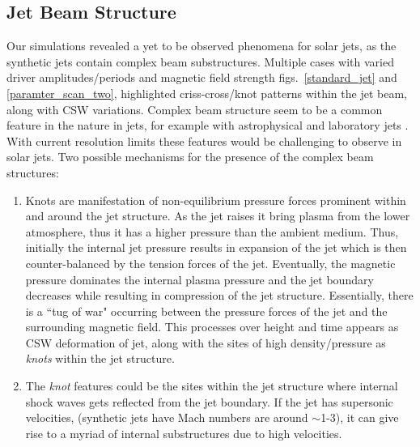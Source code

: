 \documentclass[12pt]{ociamthesis}
\begin{document}
\subsection{Jet Beam Structure}
\label{subsec:j_beam_struc}
Our simulations revealed a yet to be observed phenomena for solar jets, as the synthetic jets contain complex beam substructures. Multiple cases with varied driver amplitudes/periods and magnetic field strength figs.~\ref{standard_jet} and \ref{paramter_scan_two}, highlighted criss-cross/knot patterns within the jet beam, along with CSW variations. Complex beam structure seem to be a common feature in the nature in jets, for example with astrophysical \citep{van_Putten_1996ApJ467L57V, DeGouveiaDalPino2005, Hada2013ApJ77570H, Cohen2014ApJ787151C, Hervet2017AnA606A103H} and laboratory jets \citep{Menon2010, Edgington-Mitchell2014, Ono2014}. With current resolution limits these features would be challenging to observe in solar jets. Two possible mechanisms for the presence of the complex beam structures:
\begin{enumerate}
\item{Knots are manifestation of non-equilibrium pressure forces prominent within and around the jet structure. As the jet raises it bring plasma from the lower atmosphere, thus it has a higher pressure than the ambient medium. Thus, initially the internal jet pressure results in expansion of the jet which is then counter-balanced by the tension forces of the jet. Eventually, the magnetic pressure dominates the internal plasma pressure and the jet boundary decreases while resulting in compression of the jet structure. Essentially, there is a ``tug of war" occurring between the pressure forces of the jet and the surrounding magnetic field. This processes over height and time appears as CSW deformation of jet, along with the sites of high density/pressure as \textit{knots} within the jet structure.}
\item{The \textit{knot} features could be the sites within the jet structure where internal shock waves \citep{Norman1982} gets reflected from the jet boundary. If the jet has supersonic velocities,  (synthetic jets have Mach numbers are around $\sim$1-3), it can give rise to a myriad of internal substructures due to high velocities.}
\end{enumerate}
\end{document}
